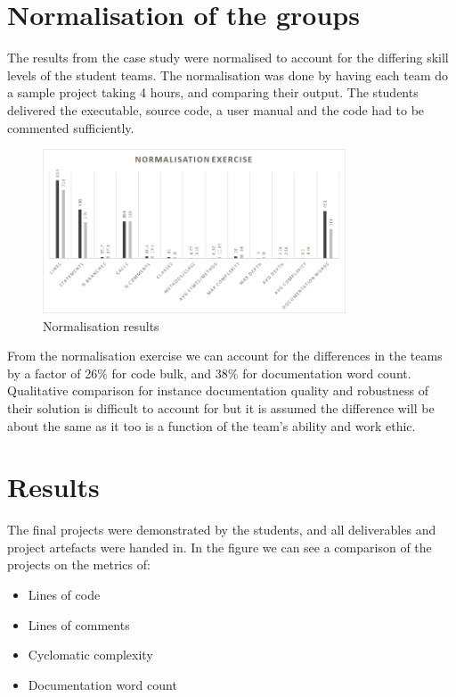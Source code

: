 \documentclass{sig-alternate-05-2015}
\begin{document}

\section{Normalisation of the groups}

The results from the case study were normalised to account for the differing skill levels of the student teams. The normalisation was done by having each team do a sample project taking 4 hours, and comparing their output. The students delivered the executable, source code, a user manual and the code had to be commented sufficiently.

\begin{figure}[t!]
	\centering 
	\includegraphics[width=90mm]{NormalisationExercise.png}
	\caption{Normalisation results}
\end{figure}  

From the normalisation exercise we can account for the differences in the teams by a factor of 26\% for code bulk, and 38\% for documentation word count. Qualitative comparison for instance documentation quality and robustness of their solution is difficult to account for but it is assumed the difference will be about the same as it too is a function of the team's ability and work ethic.

\section{Results}

The final projects were demonstrated by the students, and all deliverables and project artefacts were handed in. In the figure we can see a comparison of the projects on the metrics of:
\begin{itemize}
	\item Lines of code
	\item Lines of comments
	\item Cyclomatic complexity
	\item Documentation word count
\end{itemize}
\end{document}
